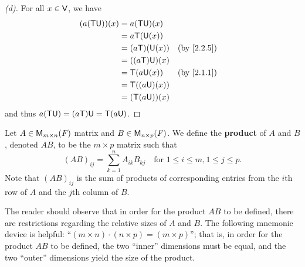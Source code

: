 \begin{proof}[(d)]
  For all \(x \in \mathsf{V}\), we have
  \begin{align*}
    (a (\T \U))(x) & = a (\T \U)(x)                   \\
                   & = a \T(\U(x))                    \\
                   & = (a \T)(\U(x))  &  & \by{2.2.5} \\
                   & = ((a \T) \U)(x)                 \\
                   & = \T(a \U(x))    &  & \by{2.1.1} \\
                   & = \T((a \U)(x))                  \\
                   & = (\T (a \U))(x)
  \end{align*}
  and thus \(a (\mathsf{T} \mathsf{U}) = (a \mathsf{T}) \mathsf{U} = \mathsf{T} (a \mathsf{U})\).
\end{proof}

\begin{defn}\label{2.3.1}
  Let \(A \in \ms\) matrix and \(B \in \ms[n][p][\F]\).
  We define the \textbf{product} of \(A\) and \(B\), denoted \(AB\), to be the \(m \times p\) matrix such that
  \[
    (AB)_{i j} = \sum_{k = 1}^n A_{i k} B_{k j} \quad \text{for } 1 \leq i \leq m, 1 \leq j \leq p.
  \]
  Note that \((AB)_{i j}\) is the sum of products of corresponding entries from the \(i\)th row of \(A\) and the \(j\)th column of \(B\).
\end{defn}

\begin{note}
  The reader should observe that in order for the product \(AB\) to be defined, there are restrictions regarding the relative sizes of \(A\) and \(B\).
  The following mnemonic device is helpful:
  ``\((m \times n) \cdot (n \times p) = (m \times p)\)'';
  that is, in order for the product \(AB\) to be defined, the two ``inner'' dimensions must be equal, and the two ``outer'' dimensions yield the size of the product.
\end{note}

